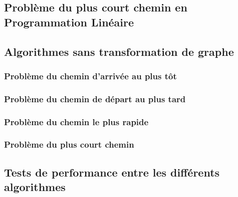 \subsection{Problème du plus court chemin en Programmation Linéaire}
\label{sec:plus-court-pl}

\subsection{Algorithmes sans transformation de graphe}
\label{sec:algos-sans-transfo}

\subsubsection{Problème du chemin d'arrivée au plus tôt}
\label{subsec:plus-tot}

\subsubsection{Problème du chemin de départ au plus tard}
\label{subsec:plus-tard}

\subsubsection{Problème du chemin le plus rapide}
\label{subsec:plus-rapide}

\subsubsection{Problème du plus court chemin}
\label{subsec:plus-court}

\subsection{Tests de performance entre les différents algorithmes}
\label{sec:tests}

